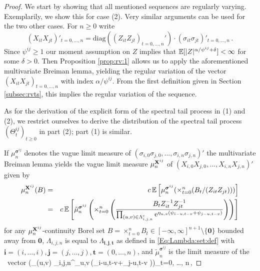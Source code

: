 \begin{proof} 
We start by showing that all mentioned sequences 
are regularly varying. Exemplarily, we show this for case (2). 
Very similar arguments can be used for the two other cases.
For $n \geq 0$ write 
$$ \left(X_{it}X_{jt}\right)'_{t=0, \ldots, n}=\mbox{diag}\left((Z_{it}Z_{jt})_{t=0, \ldots, n}'\right)\cdot
\left(\sigma_{it}\sigma_{jt}\right)'_{t=0, \ldots, n}\,.$$
Since $\psi^{ij} \geq 1$ our moment assumption on $Z$ implies that 
${\mathbb E}[|Z|^{\alpha/\psi^{ij}+\delta}]<\infty$ for some $\delta>0$. Then  Proposition \ref{prop:rv:1} 
allows us to apply the aforementioned multivariate Breiman lemma, yielding  the  
regular variation of the vector $(X_{it}X_{jt})_{t=0, \ldots, n}$ with index $\alpha/\psi^{ij}$. From the first definition given in Section \ref{subsec:rvts}, this implies the regular variation of the sequence.
\par
As for the derivation of the explicit form of the spectral tail process in (1) and (2), we restrict ourselves to derive the distribution of the spectral tail process $(\Theta_t^{ij})_{t \geq 0}$ in part (2); part (1) is similar.
\par
If $\mu_n^{{\boldsymbol{\sigma}}^{ij}}$ denotes the vague limit measure of 
$(\sigma_{i,0}\sigma_{j,0}, \ldots, \sigma_{i,n}\sigma_{j,n})'$ the multivariate Breiman lemma yields 
the vague limit measure $\mu_n^{{\bf X}^{ij}}$ of $(X_{i,0}X_{j,0}, \ldots, X_{i,n}X_{j,n})'$ given by
\begin{eqnarray}\nonumber \mu_n^{{\bf X}^{ij}}(B)&=& c\,{\mathbb E}\left[\mu_n^{\boldsymbol{\sigma}^{ij}}(\times_{t=0}^n (B_t/(Z_{it}Z_{jt})))\right] \\
&=& \label{Eq:mu:X} c\,{\mathbb E}\left[\tilde{\mu}_n^{\boldsymbol{\sigma}^{ij}}\left(\times_{t=0}^n
    \left( {
      B_t Z_{it}^{-1} Z_{jt}^{-1}
      \over
      \prod_{(u,v) \in \Lambda_{i,j,n}^c}{\rm e}^{\eta_{u,v}(\psi_{i-u,t-v}+\psi_{j-u,t-v})}
  }\right)
\right)\right] 
\end{eqnarray}
for any $\mu_n^{{\bf X}^{ij}}$-continuity  Borel set $B=\times_{t=0}^n B_t \in [-\infty,\infty]^{n+1} \setminus \{\mathbf{0}\}$ bounded away from $\mathbf{0}$, $\Lambda_{i,j,n}$ is equal to $\Lambda_{\mathbf{i}, \mathbf{j}, \mathbf{t}}$ 
as defined in \eqref{Eq:Lambda:set:def} with $\mathbf{i}=(i, \ldots, i), \mathbf{j}=(j, \ldots, j), \mathbf{t}=(0, \ldots ,n)$, and $\tilde{\mu}^{\boldsymbol{\sigma}^{ij}}_n$ 
is the limit measure of the \regvary\ vector
\beam \label{Eq:prod:sigma:tilde}
\Big(\prod_{(u,v) \in \Lambda_{i,j,n}}\ex^{\eta_{u,v}\,(\psi_{i-u,t-v}+\psi_{j-u,t-v} )}\Big)_{t=0, \ldots, n}\,,

\end{proof}
